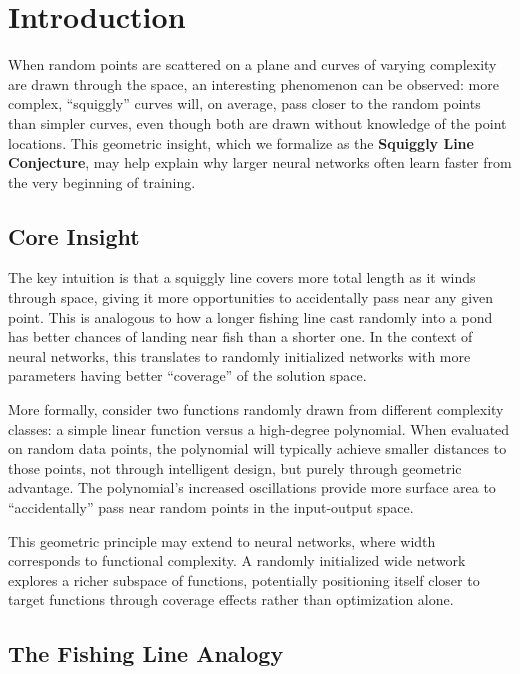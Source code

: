\section{Introduction}
\label{sec:introduction}

When random points are scattered on a plane and curves of varying complexity are drawn through the space, an interesting phenomenon can be observed: more complex, ``squiggly'' curves will, on average, pass closer to the random points than simpler curves, even though both are drawn without knowledge of the point locations. This geometric insight, which we formalize as the \textbf{Squiggly Line Conjecture}, may help explain why larger neural networks often learn faster from the very beginning of training.

\subsection{Core Insight}

The key intuition is that a squiggly line covers more total length as it winds through space, giving it more opportunities to accidentally pass near any given point. This is analogous to how a longer fishing line cast randomly into a pond has better chances of landing near fish than a shorter one. In the context of neural networks, this translates to randomly initialized networks with more parameters having better ``coverage'' of the solution space.

More formally, consider two functions randomly drawn from different complexity classes: a simple linear function versus a high-degree polynomial. When evaluated on random data points, the polynomial will typically achieve smaller distances to those points, not through intelligent design, but purely through geometric advantage. The polynomial's increased oscillations provide more surface area to ``accidentally'' pass near random points in the input-output space.

This geometric principle may extend to neural networks, where width corresponds to functional complexity. A randomly initialized wide network explores a richer subspace of functions, potentially positioning itself closer to target functions through coverage effects rather than optimization alone.

\subsection{The Fishing Line Analogy}

